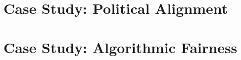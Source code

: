 




\part{Case Study: Political Alignment}






\part{Case Study: Algorithmic Fairness}






\backmatter




